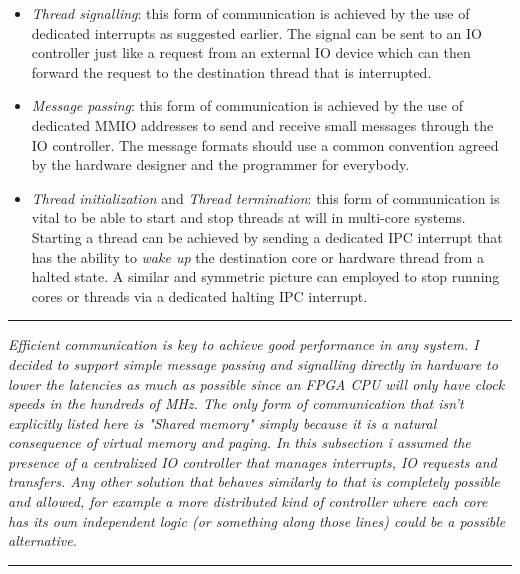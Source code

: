 \documentclass{article}
\begin{document}
            \begin{itemize}

                \item \textit{Thread signalling}: this form of communication is achieved by the use of dedicated interrupts as suggested earlier. The signal can be sent to an IO controller just like a request from an external IO device which can then forward the request to the destination thread that is interrupted.
                \item \textit{Message passing}: this form of communication is achieved by the use of dedicated MMIO addresses to send and receive small messages through the IO controller. The message formats should use a common convention agreed by the hardware designer and the programmer for everybody.
                \item \textit{Thread initialization} and \textit{Thread termination}: this form of communication is vital to be able to start and stop threads at will in multi-core systems. Starting a thread can be achieved by sending a dedicated IPC interrupt that has the ability to \textit{wake up} the destination core or hardware thread from a halted state. A similar and symmetric picture can employed to stop running cores or threads via a dedicated halting IPC interrupt.

            \end{itemize}

        \par\noindent\rule{\textwidth}{0.4pt}
        \textit{Efficient communication is key to achieve good performance in any system. I decided to support simple message passing and signalling directly in hardware to lower the latencies as much as possible since an FPGA CPU will only have clock speeds in the hundreds of MHz. The only form of communication that isn't explicitly listed here is "Shared memory" simply because it is a natural consequence of virtual memory and paging. In this subsection i assumed the presence of a centralized IO controller that manages interrupts, IO requests and transfers. Any other solution that behaves similarly to that is completely possible and allowed, for example a more distributed kind of controller where each core has its own independent logic (or something along those lines) could be a possible alternative.}
        \par\noindent\rule{\textwidth}{0.4pt}

    \clearpage
\end{document}
